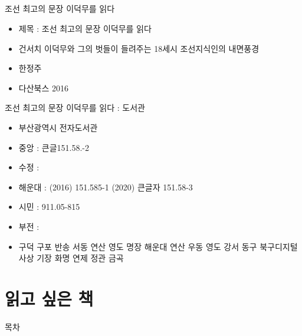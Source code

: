 \documentclass[aspectratio=1610,17pt,xcolor=pdftex,dvipsnames,table,handout]{beamer}
\begin{document}
		\begin{frame} [t,plain]
		\frametitle{}


			\begin{block} {조선 최고의 문장 이덕무를 읽다 }
			\setlength{\leftmargini}{4em}			
			\begin{itemize}
				\item 제목 : 조선 최고의 문장 이덕무를 읽다 
				\item 건서치 이덕무와 그의 벗들이 들려주는 18세시 조선지식인의 내면풍경
				\item 한정주
				\item 다산북스 2016
			\end{itemize}
			\end{block}	
					
			\begin{block} {조선 최고의 문장 이덕무를 읽다 : 도서관}
			\setlength{\leftmargini}{4em}			
			\begin{itemize}
				\item 부산광역시 전자도서관
				\item 중앙 	:	큰글151.58.-2
				\item 수정		:	
				\item 해운대	:	(2016) 151.585-1 (2020) 큰글자 151.58-3 
				\item 시민		:	911.05-815
				\item 부전		:	
				\item 구덕 구포 반송 서동 연산 영도 명장 해운대 연산 우동 영도 강서 동구 북구디지털 사상 기장 화명 연제 정관 금곡 
			\end{itemize}
			\end{block}	
		\end{frame}						



		\part{ 읽고 싶은 책 }
		\frame{\partpage}

		\begin{frame} [plain]{목차}
		\tableofcontents%
		\end{frame}
\end{document}
